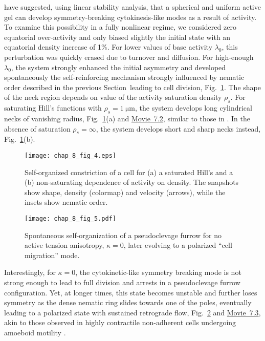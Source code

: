 {\citet{mietke2019_2} have suggested, using linear stability analysis, that a spherical and uniform active gel can develop symmetry-breaking cytokinesis-like modes as a result of activity. To examine this possibility in a fully nonlinear regime, we considered zero equatorial over-activity and only  biased slightly the initial state with an equatorial density increase  of 1\%. For lower values of base activity $\lambda_0$, this perturbation was quickly erased due to turnover and diffusion. For high-enough $\lambda_0$, the system strongly enhanced the initial asymmetry and developed spontaneously the self-reinforcing mechanism strongly influenced by nematic order described in the previous Section~leading to cell division, Fig.~\ref{fig_8_III}. The shape of the neck region depends on value of the activity saturation density $\rho_s$. For saturating Hill's functions with $\rho_s = 1 ~\si{\micro \meter}$, the system develops long cylindrical necks of vanishing radius, Fig.~\ref{fig_8_III}(a) and \href{https://github.com/waleedmirzaPhD/movies_thesis.git}{Movie~7.2}, similar to those in \cite{mietke2019}. In the absence of saturation $\rho_s = \infty$, the system develops short and sharp necks instead, Fig.~\ref{fig_8_III}(b). 


\begin{figure}[h!]
\centering
\vspace*{0cm}\texttt{[image: chap\_8\_fig\_4.eps]}
\caption{Self-organized constriction of a cell for (a) a saturated Hill's and a (b) non-saturating  dependence of activity on density. The snapshots show shape, density (colormap) and velocity (arrows), while the insets show nematic order. }
\label{fig_8_III}
\end{figure} 


\begin{figure}[h!]
\centering
\vspace*{0cm}\texttt{[image: chap\_8\_fig\_5.pdf]}
\caption{Spontaneous self-organization of a pseudoclevage furrow for no active  tension anisotropy, $\kappa = 0$, later evolving to a polarized ``cell migration'' mode.}
\label{fig_8.1_III}
\end{figure} 

Interestingly, for $\kappa=0$, the cytokinetic-like symmetry breaking mode is not strong enough to lead to full division and arrests in a pseudoclevage furrow configuration. Yet, at longer times, this state becomes unstable and further loses symmetry as the dense nematic ring slides towards one of the poles, eventually leading to a polarized state with sustained retrograde flow, Fig.~\ref{fig_8.1_III} and \href{https://github.com/waleedmirzaPhD/movies_thesis.git}{Movie~7.3}, akin to those observed in highly contractile non-adherent cells undergoing amoeboid motility \cite{Ruprecht:2015aa}.



}
